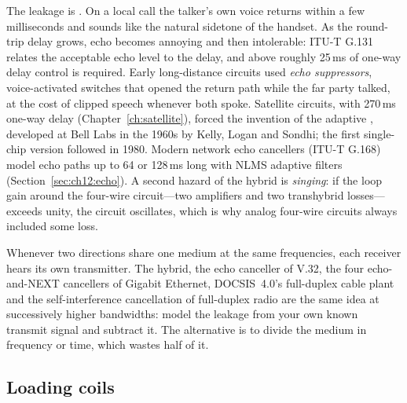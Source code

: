 The leakage is . On a local call the talker's own voice returns within a few
milliseconds and sounds like the natural sidetone of the handset. As the round-trip delay grows,
echo becomes annoying and then intolerable: ITU-T G.131 relates the acceptable echo level to the
delay, and above roughly 25\,ms of one-way delay control is required. Early long-distance circuits
used \emph{echo suppressors}, voice-activated switches that opened the return path while the far
party talked, at the cost of clipped speech whenever both spoke. Satellite circuits, with 270\,ms
one-way delay (Chapter~\ref{ch:satellite}), forced the invention of the adaptive , developed at Bell Labs in the 1960s by Kelly, Logan and Sondhi; the first single-chip
version followed in 1980. Modern network echo cancellers (ITU-T G.168) model echo paths up to
64 or 128\,ms long with NLMS adaptive filters (Section~\ref{sec:ch12:echo}). A second hazard of the
hybrid is \emph{singing}: if the loop gain around the four-wire circuit---two amplifiers and two
transhybrid losses---exceeds unity, the circuit oscillates, which is why analog four-wire circuits
always included some loss.


\begin{keyidea}
Whenever two directions share one medium at the same frequencies, each receiver hears its own
transmitter. The hybrid, the echo canceller of V.32, the four echo-and-NEXT cancellers of
Gigabit Ethernet, DOCSIS~4.0's full-duplex cable plant and the self-interference cancellation of
full-duplex radio are the same idea at successively higher bandwidths: model the leakage from your
own known transmit signal and subtract it. The alternative is to divide the medium in frequency or
time, which wastes half of it.
\end{keyidea}

\subsection{Loading coils}

